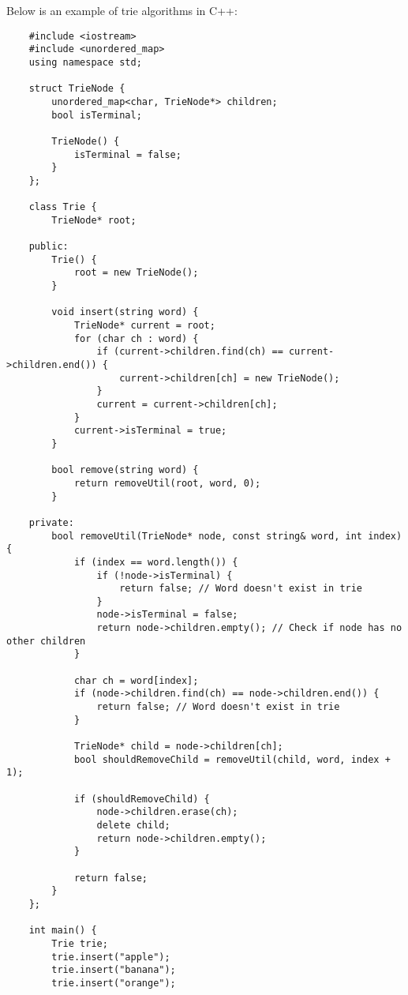 \begin{solution}
    Below is an example of trie algorithms in C++:

    \horizontalline

    \begin{verbatim}
    #include <iostream>
    #include <unordered_map>
    using namespace std;
    
    struct TrieNode {
        unordered_map<char, TrieNode*> children;
        bool isTerminal;
    
        TrieNode() {
            isTerminal = false;
        }
    };
    
    class Trie {
        TrieNode* root;
    
    public:
        Trie() {
            root = new TrieNode();
        }
    
        void insert(string word) {
            TrieNode* current = root;
            for (char ch : word) {
                if (current->children.find(ch) == current->children.end()) {
                    current->children[ch] = new TrieNode();
                }
                current = current->children[ch];
            }
            current->isTerminal = true;
        }
    
        bool remove(string word) {
            return removeUtil(root, word, 0);
        }
    
    private:
        bool removeUtil(TrieNode* node, const string& word, int index) {
            if (index == word.length()) {
                if (!node->isTerminal) {
                    return false; // Word doesn't exist in trie
                }
                node->isTerminal = false;
                return node->children.empty(); // Check if node has no other children
            }
    
            char ch = word[index];
            if (node->children.find(ch) == node->children.end()) {
                return false; // Word doesn't exist in trie
            }
    
            TrieNode* child = node->children[ch];
            bool shouldRemoveChild = removeUtil(child, word, index + 1);
    
            if (shouldRemoveChild) {
                node->children.erase(ch);
                delete child;
                return node->children.empty();
            }
    
            return false;
        }
    };
    
    int main() {
        Trie trie;
        trie.insert("apple");
        trie.insert("banana");
        trie.insert("orange");
    

\end{verbatim}
\end{solution}
